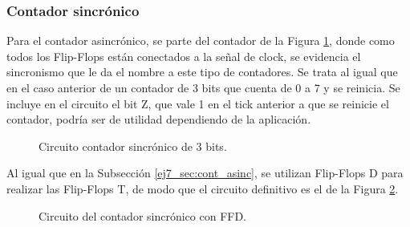 \subsubsection{Contador sincr\'onico}
\noindent
Para el contador asincr\'onico, se parte del contador de la Figura \ref{ej7_fig:sinc_circ}, donde como todos los Flip-Flops est\'an conectados a la señal de clock, se evidencia el sincronismo que le da el nombre a este tipo de contadores. Se trata al igual que en el caso anterior de un contador de 3 bits que cuenta de 0 a 7 y se reinicia. Se incluye en el circuito el bit Z, que vale 1 en el tick anterior a que se reinicie el contador, podr\'ia ser de utilidad dependiendo de la aplicaci\'on.
%
\begin{figure}[H]
	\centering
	\caption{Circuito contador sincr\'onico de 3 bits.}
	\label{ej7_fig:sinc_circ}
\end{figure}
%
\noindent
Al igual que en la Subsecci\'on \ref{ej7_sec:cont_asinc}, se utilizan Flip-Flops D para realizar las Flip-Flops T, de modo que el circuito definitivo es el de la Figura \ref{ej7_fig:sinc_circ_final}.
%
\begin{figure}[H]
	\centering
	\caption{Circuito del contador sincr\'onico con FFD.}
	\label{ej7_fig:sinc_circ_final}
\end{figure}
%
